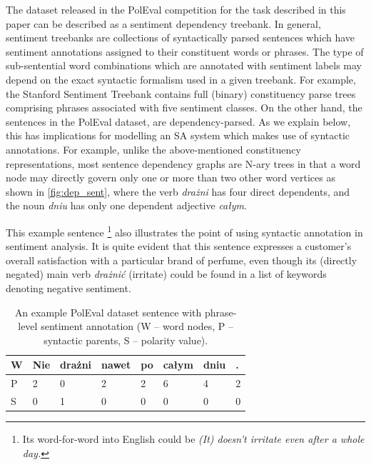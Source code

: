 \documentclass[10pt, a4paper]{article}
\begin{document}
The dataset released in the PolEval competition for the task described in this paper can be described as a sentiment dependency treebank. In general, sentiment treebanks are collections of syntactically parsed sentences which have sentiment annotations assigned to their constituent words or phrases. The type of sub-sentential word combinations which are annotated with  sentiment labels may depend on the exact syntactic formalism used in a given treebank. For example, the Stanford Sentiment Treebank \cite{socher2013recursive} contains full (binary) constituency parse trees comprising phrases associated with five sentiment classes. On the other hand, the sentences in the PolEval dataset, are dependency-parsed. As we explain below, this has implications for modelling an SA system which makes use of syntactic annotations. For example, unlike the above-mentioned constituency representations, most sentence dependency graphs are N-ary trees in that a word node may directly govern only one or more than two other word vertices as shown in \ref{fig:dep_sent}, where the verb \textit{drażni} has four direct dependents, and the noun \textit{dniu} has only one dependent adjective \textit{całym}. 
\par This example sentence \footnote{Its word-for-word into English could be \textit{(It) doesn't irritate even after a whole day.}} also illustrates the point of using syntactic annotation in sentiment analysis. It is quite evident that this sentence expresses a customer's overall satisfaction with a particular brand of perfume, even though its (directly negated) main verb \textit{drażnić} (irritate) could be found in a list of keywords denoting negative sentiment.
 

\begin{table}[h]
 \begin{center}
\begin{tabular}{|l| l l l l l l l|}
      \hline
      W & Nie & drażni & nawet & po & całym & dniu & . \\
      \hline
      P & 2 & 0 & 2 & 2 & 6 & 4 & 2 \\
      \hline
      S & 0 & 1 & 0 & 0 & 0 & 0 & 0 \\
      \hline
\end{tabular}
\caption{An example PolEval dataset sentence with phrase-level sentiment annotation (W -- word nodes, P -- syntactic parents, S -- polarity value).}
\label{tab:nie_drazni_1}
 \end{center}
\end{table}
\end{document}

